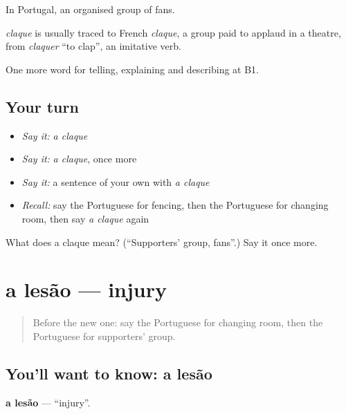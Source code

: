 In Portugal, an organised group of fans.

\begin{cousinweb}
\emph{claque} is usually traced to French \emph{claque}, a group paid to applaud in a theatre, from \emph{claquer} \textquotedblleft{}to clap\textquotedblright{}, an imitative verb.
\end{cousinweb}

\begin{grammarlens}[title={What you've built}]
One more word for telling, explaining and describing at B1.
\end{grammarlens}

\subsection*{Your turn}
\begin{itemize}
\raggedright
  \item \emph{Say it:} \emph{a claque}
  \item \emph{Say it:} \emph{a claque}, once more
  \item \emph{Say it:} a sentence of your own with \emph{a claque}
  \item \emph{Recall:} say the Portuguese for fencing, then the Portuguese for changing room, then say \emph{a claque} again
\end{itemize}

\begin{tcolorbox}[breakable,colback=teal!4,colframe=teal!35!black,title={Before you move on}]
What does a claque mean? (\textquotedblleft{}Supporters' group, fans\textquotedblright{}.) Say it once more.
\end{tcolorbox}
\section[a lesão]{a lesão — injury}

\label{lesson:PT-C515-lesao}



\begin{quote}
Before the new one: say the Portuguese for changing room, then the Portuguese for supporters' group.
\end{quote}

\subsection*{You'll want to know: a lesão}
\textbf{a lesão} — \textquotedblleft{}injury\textquotedblright{}.

